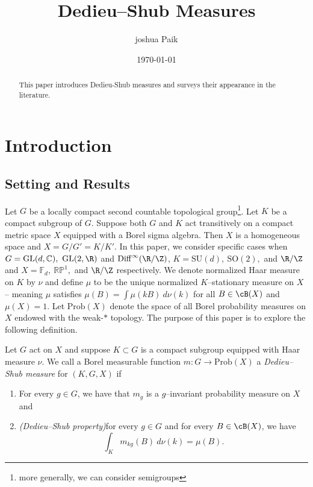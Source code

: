\documentclass[10pt]{amsart}
\title{Dedieu--Shub Measures}
\author{joshua Paik}
\date{\today}
\numberwithin{equation}{section}     %
\newcommand{\C}{\mathbb{C}}
\newcommand{\FF}{\mathbb{F}}
\newcommand{\RP}{\mathbb{RP}}
\newcommand{\SO}{\mathrm{SO}}
\newcommand{\GL}{\mathrm{GL}}
\newcommand{\SU}{\mathrm{SU}}
\newcommand{\Diff}{\mathrm{Diff}}
\newcommand{\Prob}{\mathrm{Prob}}
\begin{document}
\begin{abstract}
This paper introduces Dedieu-Shub measures and surveys their appearance in the literature. 
\end{abstract}


\maketitle



\section{Introduction}

\subsection{Setting and Results}

 Let $G$ be a locally compact second countable topological group\footnote{more generally, we can consider semigroups}. Let $K$ be a compact subgroup of $G$. Suppose both $G$ and $K$ act transitively on a compact metric space $X$ equipped with a Borel sigma algebra. Then $X$ is a homogeneous space and $X = G/G' = K/K'$. In this paper, we consider specific cases when $G = \GL(d,\C), \ \GL(2,\R)$ and $\Diff^\infty(\R/\Z)$, $K = \SU(d), \ \SO(2),$ and $\R/\Z$ and $X = \FF_d, \ \RP^1,$ and $\R/\Z$ respectively. We denote normalized Haar measure on $K$ by $\nu$ and define $\mu$ to be the unique normalized $K$--stationary measure on $X$ -- meaning $\mu$ satisfies $\mu(B) = \int \mu(kB) \ d\nu(k)$ for all $B \in \cB(X)$ and $\mu(X) = 1$. Let $\Prob(X)$ denote the space of all Borel probability measures on $X$ endowed with the weak-$*$ topology. The purpose of this paper is to explore the following definition.

\begin{definition} \label{definition}
Let $G$ act on $X$ and suppose $K \subset G$ is a compact subgroup equipped with Haar measure $\nu$. We call a Borel measurable function $m: G \to \Prob(X)$ a \textit{Dedieu--Shub measure} for $(K,G,X)$ if 
\begin{enumerate}
\item For every $g \in G$, we have that $m_g$ is a $g$--invariant probability measure on $X$ and
\item \textit{(Dedieu--Shub property)}for every $g \in G$ and for every $B \in \cB(X)$, we have $$\int_K m_{kg}(B) \ d\nu(k) = \mu(B).$$
\end{enumerate}
\end{definition}
\end{document}
